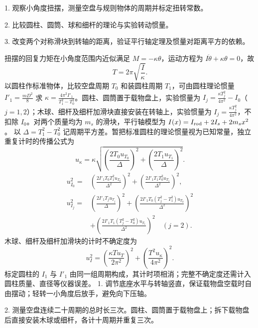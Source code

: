 
\usepackage{multirow}
\fontsize{10.5pt}{20pt}\selectfont
{}
1. 观察小角度扭摆，测量空盘与规则物体的周期并标定扭转常数。\par
2. 比较圆柱、圆筒、球和细杆的理论与实验转动惯量。\par
3. 改变两个对称滑块到转轴的距离，验证平行轴定理及惯量对距离平方的依赖。\par
{}
扭摆的回复力矩在小角度范围内近似满足 $M=-\kappa\theta$，运动方程为 $I\ddot\theta+\kappa\theta=0$，故
\[T=2\pi\sqrt{\frac I\kappa}.\]
以圆柱作标准物体，比较空盘周期 $T_0$ 和装圆柱周期 $T_1$，可由圆柱理论惯量 $I'_1=\frac{mD^2}{8}$ 求 $\kappa=\frac{4\pi^2I'_1}{T_1^2-T_0^2}$。圆柱、圆筒置于载物盘上，实验惯量为 $I_j=\frac{\kappa T_j^2}{4\pi^2}-I_0$（$j=1,2$）；木球、细杆及细杆加滑块直接安装在转轴上，实验惯量为 $I_j=\frac{\kappa T_j^2}{4\pi^2}$，不扣除 $I_0$。对两个质量均为 $m_s$ 的滑块，平行轴模型为 $I(x)=I_{\rm rod}+2I_s+2m_sx^2$。
以 $\Delta=T_1^2-T_0^2$ 记周期平方差。暂把标准圆柱的理论惯量视为已知常量，独立重复计时的传播公式为
\[u_\kappa=\kappa\sqrt{\left(\frac{2T_0u_{T_0}}{\Delta}\right)^2+
\left(\frac{2T_1u_{T_1}}{\Delta}\right)^2}.\]
\[\begin{aligned}
u_{I_0}^2={}&\left(\frac{2I'_1T_0T_1^2u_{T_0}}{\Delta^2}\right)^2+
\left(\frac{2I'_1T_1T_0^2u_{T_1}}{\Delta^2}\right)^2,\\
u_{I_j}^2={}&\left(\frac{2I'_1T_ju_{T_j}}{\Delta}\right)^2+
\left(\frac{2I'_1T_0(T_j^2-T_1^2)u_{T_0}}{\Delta^2}\right)^2\\
&+\left(\frac{2I'_1T_1(T_j^2-T_0^2)u_{T_1}}{\Delta^2}\right)^2\quad(j=2).
\end{aligned}\]
木球、细杆及细杆加滑块的计时不确定度为
\[u_I^2=\left(\frac{\kappa T u_T}{2\pi^2}\right)^2+\left(\frac{T^2u_\kappa}{4\pi^2}\right)^2.\]
标定圆柱的 $I_1$ 与 $I'_1$ 由同一组周期构成，其计时项相消；完整不确定度还需计入圆柱质量、直径等仪器误差。
1. 调节底座水平与转轴竖直，保证载物盘空载时自由摆动；轻转一小角度后放手，避免向下压轴。\par
2. 测量空盘连续二十周期的总时长三次。圆柱、圆筒置于载物盘上；拆下载物盘后直接安装木球或细杆，各计十周期并重复三次。\par
